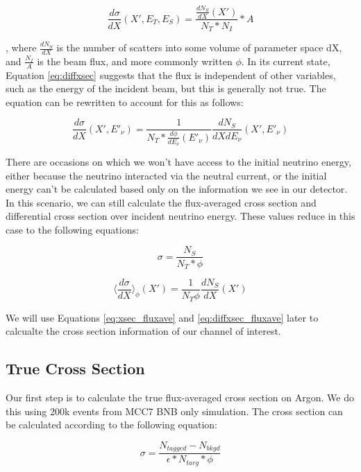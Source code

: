 \documentclass[12pt]{article}
\begin{document}
\begin{equation}
\frac{d\sigma}{dX}(X',E_T,E_S) = \frac{\frac{dN_S}{dX}(X')}{N_T*N_I} * A 
\label{eq:diffxsec}
\end{equation}

, where $\frac{dN_S}{dX}$ is the number of scatters into some volume of parameter space dX, and $\frac{N_I}{A}$ is the beam flux, and more commonly written $\phi$. In its current state, Equation \ref{eq:diffxsec} suggests that the flux is independent of other variables, such as the energy of the incident beam, but this is generally not true. The equation can be rewritten to account for this as follows:

\begin{equation}
\frac{d\sigma}{dX}(X',E'_\nu) = \frac{1}{N_T*\frac{d\phi}{dE_\nu}(E'_\nu)}\frac{dN_S}{dXdE_\nu}(X',E'_\nu)
\label{eq:diffxsec_edep}
\end{equation}

There are occasions on which we won't have access to the initial neutrino energy, either because the neutrino interacted via the neutral current, or the initial energy can't be calculated based only on the information we see in our detector. In this scenario, we can still calculate the flux-averaged cross section and differential cross section over incident neutrino energy. These values reduce in this case to the following equations:

\begin{equation}
\sigma = \frac{N_S}{N_T * \phi}
\label{eq:xsec_fluxave}
\end{equation}

\begin{equation}
\Big \langle \frac{d\sigma}{dX} \Big \rangle_\phi(X') = \frac{1}{N_T\phi}\frac{dN_S}{dX}(X')
\label{eq:diffxsec_fluxave}
\end{equation}

We will use Equations \ref{eq:xsec_fluxave} and \ref{eq:diffxsec_fluxave} later to calcualte the cross section information of our channel of interest.

\subsection{True Cross Section}
Our first step is to calculate the true flux-averaged cross section on Argon. We do this using 200k events from MCC7 BNB only simulation.  The cross section can be calculated according to the following equation:

\begin{equation}
  \sigma = \frac{N_{tagged} - N_{bkgd}}{\epsilon*N_{targ}*\phi}
\end{equation}
\end{document}

